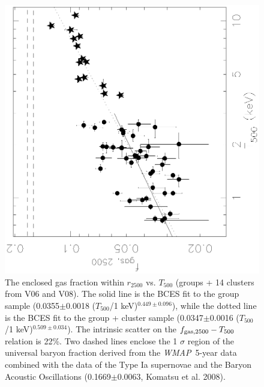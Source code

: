 \documentclass{aastex}
\def\wmap        {{\em WMAP}\/}
\begin{document}
\begin{figure} 
\centerline{\includegraphics[height=0.45\linewidth,angle=270]{f17.ps}}
  \caption{The enclosed gas fraction within $r_{2500}$ vs. $T_{500}$ (groups +
14 clusters from V06 and V08). The solid line is the BCES fit to the group
sample (0.0355$\pm$0.0018 ($T_{500}$/1 keV)$^{0.449\pm0.096}$),
while the dotted line is the BCES fit to the group + cluster sample
(0.0347$\pm$0.0016 ($T_{500}$/1 keV)$^{0.509\pm0.034}$). The intrinsic scatter on the
$f_{\rm gas, 2500} - T_{500}$ relation is 22\%.
Two dashed lines enclose the 1 $\sigma$ region of the universal baryon fraction
derived from the \wmap\ 5-year data combined with the data of the Type Ia supernovae
and the Baryon Acoustic Oscillations (0.1669$\pm$0.0063, Komatsu et al. 2008).
}
\end{figure}
\end{document}
